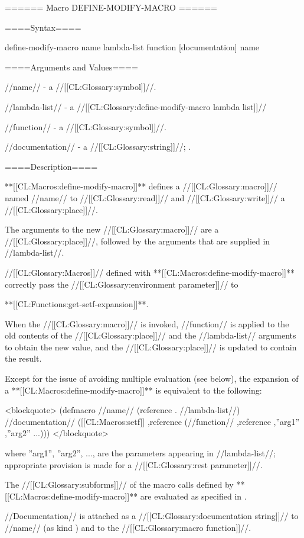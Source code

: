====== Macro DEFINE-MODIFY-MACRO ======

====Syntax====

\DefmacWithValues define-modify-macro {name lambda-list function [documentation]} {name}

====Arguments and Values====

//name// - a //[[CL:Glossary:symbol]]//.

//lambda-list// - a //[[CL:Glossary:define-modify-macro lambda list]]//

//function// - a //[[CL:Glossary:symbol]]//.

//documentation// - a //[[CL:Glossary:string]]//; \noeval.

====Description====

**[[CL:Macros:define-modify-macro]]** defines a //[[CL:Glossary:macro]]// named //name// to //[[CL:Glossary:read]]// and //[[CL:Glossary:write]]// a //[[CL:Glossary:place]]//.

The arguments to the new //[[CL:Glossary:macro]]// are a //[[CL:Glossary:place]]//, followed by the arguments that are supplied in //lambda-list//.

//[[CL:Glossary:Macros]]// defined with **[[CL:Macros:define-modify-macro]]** correctly pass the //[[CL:Glossary:environment parameter]]// to

**[[CL:Functions:get-setf-expansion]]**.

When the //[[CL:Glossary:macro]]// is invoked, //function// is applied to the old contents of the //[[CL:Glossary:place]]// and the //lambda-list// arguments to obtain the new value, and the //[[CL:Glossary:place]]// is updated to contain the result.

Except for the issue of avoiding multiple evaluation (see below), the expansion of a **[[CL:Macros:define-modify-macro]]** is equivalent to the following:

<blockquote> (defmacro //name// (reference . //lambda-list//) //documentation// \bq([[CL:Macros:setf]] ,reference (//function// ,reference ,''arg1'' ,''arg2'' ...))) </blockquote>

where ''arg1'', ''arg2'', ..., are the parameters appearing in //lambda-list//; appropriate provision is made for a //[[CL:Glossary:rest parameter]]//.

The //[[CL:Glossary:subforms]]// of the macro calls defined by **[[CL:Macros:define-modify-macro]]** are evaluated as specified in \secref\GenRefSubFormEval.

//Documentation// is attached as a //[[CL:Glossary:documentation string]]// to //name// (as kind ) and to the //[[CL:Glossary:macro function]]//.

